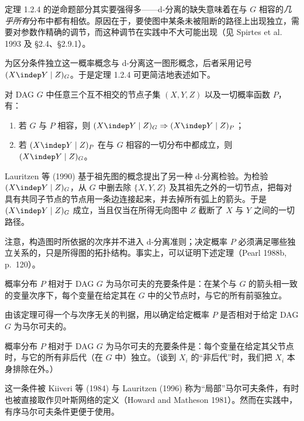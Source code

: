 定理 1.2.4 的逆命题部分其实要强得多——d-分离的缺失意味着在与 $G$ 相容的\emph{几乎所有}分布中都有相依。原因在于，要使图中某条未被阻断的路径上出现独立，需要对参数作精确的调节，而这种调节在实践中不大可能出现（见 Spirtes et al. 1993 及 \S 2.4、\S 2.9.1）。

为区分条件独立这一概率概念与 d-分离这一图形概念，后者采用记号 $(X\indep Y\mid Z)_G$。于是定理 1.2.4 可更简洁地表述如下。

\begin{theorem}
对 DAG $G$ 中任意三个互不相交的节点子集 $(X,Y,Z)$ 以及一切概率函数 $P$，有：
\begin{enumerate}[label=(\roman*)]
\item 若 $G$ 与 $P$ 相容，则 $(X\indep Y\mid Z)_G\Rightarrow(X\indep Y\mid Z)_P$；
\item 若 $(X\indep Y\mid Z)_P$ 在与 $G$ 相容的一切分布中都成立，则 $(X\indep Y\mid Z)_G$。
\end{enumerate}
\end{theorem}

Lauritzen 等 (1990) 基于祖先图的概念提出了另一种 d-分离检验。为检验 $(X\indep Y\mid Z)_G$，从 $G$ 中删去除 $\{X,Y,Z\}$ 及其祖先之外的一切节点，把每对具有共同子节点的节点用一条边连接起来，并去掉所有弧上的箭头。于是 $(X\indep Y\mid Z)_G$ 成立，当且仅当在所得无向图中 $Z$ 截断了 $X$ 与 $Y$ 之间的一切路径。

注意，构造图时所依据的次序并不进入 d-分离准则；决定概率 $P$ 必须满足哪些独立关系的，只是所得图的拓扑结构。事实上，可以证明下述定理（Pearl 1988b, p.~120）。

\begin{theorem}[有序马尔可夫条件]
概率分布 $P$ 相对于 DAG $G$ 为马尔可夫的充要条件是：在某个与 $G$ 的箭头相一致的变量次序下，每个变量在给定其在 $G$ 中的父节点时，与它的所有前驱独立。
\end{theorem}

由该定理可得一个与次序无关的判据，用以确定给定概率 $P$ 是否相对于给定 DAG $G$ 为马尔可夫的。

\begin{theorem}[父节点马尔可夫条件]
概率分布 $P$ 相对于 DAG $G$ 为马尔可夫的充要条件是：每个变量在给定其父节点时，与它的所有非后代（在 $G$ 中）独立。（谈到 $X_i$ 的“非后代”时，我们把 $X_i$ 本身排除在外。）
\end{theorem}

这一条件被 Kiiveri 等 (1984) 与 Lauritzen (1996) 称为“局部”马尔可夫条件，有时也被直接取作贝叶斯网络的定义（Howard and Matheson 1981）。然而在实践中，有序马尔可夫条件更便于使用。

